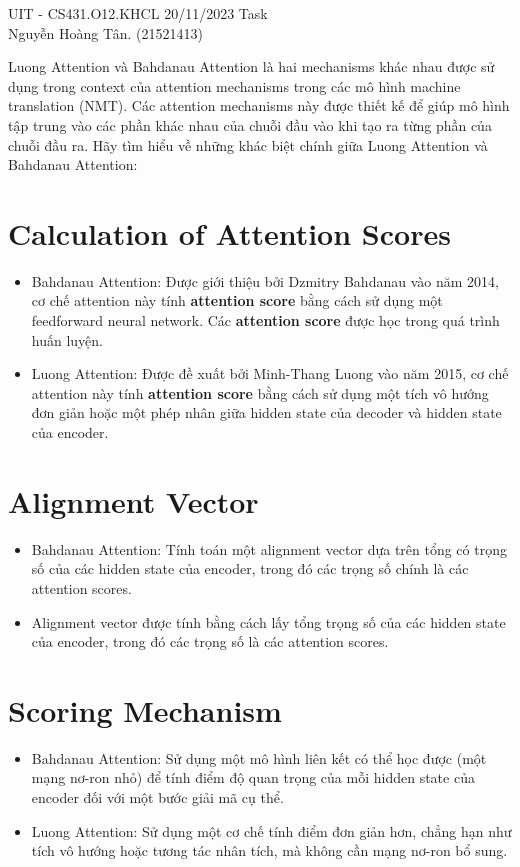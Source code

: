 \documentclass[12pt]{article}
\begin{document}
\noindent UIT - CS431.O12.KHCL \hfill 20/11/2023 Task \\
Nguyễn Hoàng Tân. (21521413)

\hrulefill

Luong Attention và Bahdanau Attention là hai mechanisms khác nhau được sử dụng trong context của attention mechanisms trong các mô hình machine translation (NMT). Các attention mechanisms này được thiết kế để giúp mô hình tập trung vào các phần khác nhau của chuỗi đầu vào khi tạo ra từng phần của chuỗi đầu ra. Hãy tìm hiểu về những khác biệt chính giữa Luong Attention và Bahdanau Attention:
\section{Calculation of \textbf{Attention Score}s}

\begin{itemize}
	\item Bahdanau Attention: Được giới thiệu bởi Dzmitry Bahdanau vào năm 2014, cơ chế attention này tính \textbf{attention score} bằng cách sử dụng một feedforward neural network. Các \textbf{attention score} được học trong quá trình huấn luyện.
	\item Luong Attention: Được đề xuất bởi Minh-Thang Luong vào năm 2015, cơ chế attention này tính \textbf{attention score} bằng cách sử dụng một tích vô hướng đơn giản hoặc một phép nhân giữa hidden state của decoder và hidden state của encoder.
\end{itemize}
\section{Alignment Vector}
\begin{itemize}
	\item Bahdanau Attention: Tính toán một alignment vector dựa trên tổng có trọng số của các hidden state của encoder, trong đó các trọng số chính là các attention scores.
	\item Alignment vector được tính bằng cách lấy tổng trọng số của các hidden state của encoder, trong đó các trọng số là các attention scores.
\end{itemize}
\section{Scoring Mechanism}
\begin{itemize}
	\item Bahdanau Attention: Sử dụng một mô hình liên kết có thể học được (một mạng nơ-ron nhỏ) để tính điểm độ quan trọng của mỗi hidden state của encoder đối với một bước giải mã cụ thể.
	\item Luong Attention: Sử dụng một cơ chế tính điểm đơn giản hơn, chẳng hạn như tích vô hướng hoặc tương tác nhân tích, mà không cần mạng nơ-ron bổ sung.
\end{itemize}
\end{document}

